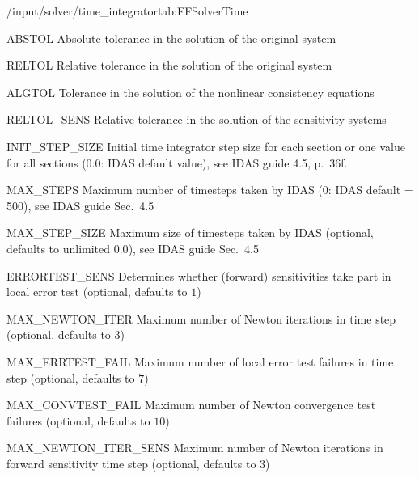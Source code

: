 \begin{groupscope}{/input/solver/time\_integrator}{tab:FFSolverTime}
  \begin{dataset}[type=double,range={$> 0$},length=1]{ABSTOL}
    Absolute tolerance in the solution of the original system
  \end{dataset}
  \begin{dataset}[type=double,range={$\geq 0$},length=1]{RELTOL}
    Relative tolerance in the solution of the original system
  \end{dataset}
  \begin{dataset}[type=double,range={$> 0$},length=1]{ALGTOL}
    Tolerance in the solution of the nonlinear consistency equations
  \end{dataset}
  \begin{dataset}[type=double,range={$\geq 0$},length=1]{RELTOL\_SENS}
    Relative tolerance in the solution of the sensitivity systems
  \end{dataset}
  \begin{dataset}[type=double,unit={\si{\second}},range={$\geq 0$},length={1 / \texttt{NSEC}}]{INIT\_STEP\_SIZE}
    Initial time integrator step size for each section or one value for all sections ($0.0$: IDAS default value), see IDAS guide 4.5, p.\ 36f.
  \end{dataset}
  \begin{dataset}[type=int,range={$\geq 0$},length=1]{MAX\_STEPS}
    Maximum number of timesteps taken by IDAS (0: IDAS default = 500), see IDAS guide Sec.~4.5
  \end{dataset}
  \begin{dataset}[type=double,unit={\si{\second}},range={$\geq 0$},length=1]{MAX\_STEP\_SIZE}
    Maximum size of timesteps taken by IDAS (optional, defaults to unlimited $0.0$), see IDAS guide Sec.~4.5
  \end{dataset}
  \begin{dataset}[type=int,range={$\{0,1\}$},length=1]{ERRORTEST\_SENS}
    Determines whether (forward) sensitivities take part in local error test (optional, defaults to $1$)
  \end{dataset}
  \begin{dataset}[type=int,range={$\geq 0$},length=1]{MAX\_NEWTON\_ITER}
    Maximum number of Newton iterations in time step (optional, defaults to $3$)
  \end{dataset}
  \begin{dataset}[type=int,range={$\geq 0$},length=1]{MAX\_ERRTEST\_FAIL}
    Maximum number of local error test failures in time step (optional, defaults to $7$)
  \end{dataset}
  \begin{dataset}[type=int,range={$\geq 0$},length=1]{MAX\_CONVTEST\_FAIL}
    Maximum number of Newton convergence test failures (optional, defaults to $10$)
  \end{dataset}
  \begin{dataset}[type=int,range={$\geq 0$},length=1]{MAX\_NEWTON\_ITER\_SENS}
    Maximum number of Newton iterations in forward sensitivity time step (optional, defaults to $3$)
  \end{dataset}
\end{groupscope}

